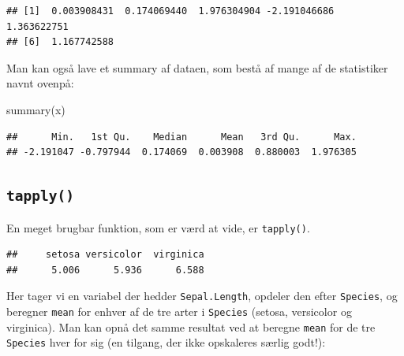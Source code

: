 \documentclass[
]{book}
\newenvironment{Shaded}{\begin{snugshade}}{\end{snugshade}}
\newcommand{\CommentTok}[1]{\textcolor[rgb]{0.56,0.35,0.01}{\textit{#1}}}
\newcommand{\FunctionTok}[1]{\textcolor[rgb]{0.00,0.00,0.00}{#1}}
\newcommand{\NormalTok}[1]{#1}
\newcommand{\SpecialCharTok}[1]{\textcolor[rgb]{0.00,0.00,0.00}{#1}}
\begin{document}
\begin{verbatim}
## [1]  0.003908431  0.174069440  1.976304904 -2.191046686  1.363622751
## [6]  1.167742588
\end{verbatim}

Man kan også lave et summary af dataen, som bestå af mange af de statistiker navnt ovenpå:

\begin{Shaded}
\begin{Highlighting}[]
\FunctionTok{summary}\NormalTok{(x)}
\end{Highlighting}
\end{Shaded}

\begin{verbatim}
##      Min.   1st Qu.    Median      Mean   3rd Qu.      Max. 
## -2.191047 -0.797944  0.174069  0.003908  0.880003  1.976305
\end{verbatim}

\hypertarget{tapply}{%
\subsection{\texorpdfstring{\texttt{tapply()}}{tapply()}}\label{tapply}}

En meget brugbar funktion, som er værd at vide, er \texttt{tapply()}.

\begin{Shaded}
\end{Shaded}

\begin{verbatim}
##     setosa versicolor  virginica 
##      5.006      5.936      6.588
\end{verbatim}

Her tager vi en variabel der hedder \texttt{Sepal.Length}, opdeler den efter \texttt{Species}, og beregner \texttt{mean} for enhver af de tre arter i \texttt{Species} (setosa, versicolor og virginica). Man kan opnå det samme resultat ved at beregne \texttt{mean} for de tre \texttt{Species} hver for sig (en tilgang, der ikke opskaleres særlig godt!):
\end{document}
